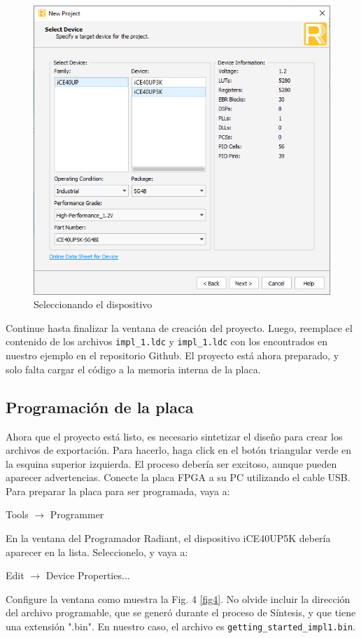 \documentclass[11pt, a4paper, oneside]{article}
\begin{document}
\begin{figure}[h!]
	\centering
	\includegraphics[scale=0.71]{figs/fig3.png}
	\caption{Seleccionando el dispositivo}
	\label{fig3}
\end{figure}

Continue hasta finalizar la ventana de creación del proyecto. Luego, reemplace el contenido de los archivos \texttt{impl\_1.ldc} y \texttt{impl\_1.ldc} con los encontrados en nuestro ejemplo en el repositorio Github. El proyecto está ahora preparado, y solo falta cargar el código a la memoria interna de la placa.

\subsection{Programación de la placa}

Ahora que el proyecto está listo, es necesario sintetizar el diseño para crear los archivos de exportación. Para hacerlo, haga click en el botón triangular verde en la esquina superior izquierda. El proceso debería ser excitoso, aunque pueden aparecer advertencias. Conecte la placa FPGA a su PC utilizando el cable USB. Para preparar la placa para ser programada, vaya a:
\begin{center}
	Tools $\rightarrow$ Programmer
\end{center}
En la ventana del Programador Radiant, el dispositivo iCE40UP5K debería aparecer en la lista. Seleccionelo, y vaya a:
\begin{center}
	Edit $\rightarrow$ Device Properties...
\end{center}
Configure la ventana como muestra la Fig. 4 \ref{fig4}. No olvide incluir la dirección del archivo programable, que se generó durante el proceso de Síntesis, y que tiene una extensión ".bin". En nuestro caso, el archivo es \texttt{getting\_started\_impl1.bin}.
\end{document}
